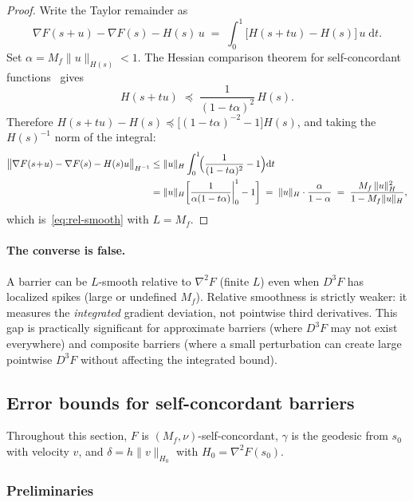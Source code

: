 \documentclass[11pt]{article}
\begin{document}
\begin{proof}
Write the Taylor remainder as
\[
  \nabla F(s+u) - \nabla F(s) - H(s)\,u
  \;=\; \int_0^1 \bigl[H(s+tu) - H(s)\bigr]\,u\;\mathrm{d}t.
\]
Set $\alpha = M_f\|u\|_{H(s)} < 1$.  The Hessian comparison theorem
for self-concordant functions~\cite[Thm.~5.1.1]{nesterov2004} gives
\[
  H(s+tu) \;\preceq\; \frac{1}{(1 - t\alpha)^2}\, H(s).
\]
Therefore $H(s+tu) - H(s) \preceq \bigl[(1-t\alpha)^{-2} - 1\bigr] H(s)$,
and taking the $H(s)^{-1}$ norm of the integral:
\begin{align*}
  \bigl\|\nabla F(s\!+\!u) - \nabla F(s) - H(s)u\bigr\|_{H^{-1}}
  &\leq \|u\|_H \int_0^1 \!\Bigl(\frac{1}{(1-t\alpha)^2} - 1\Bigr)\mathrm{d}t \\
  &= \|u\|_H \biggl[\frac{1}{\alpha(1-t\alpha)}\bigg|_0^1 - 1\biggr]
  \;=\; \|u\|_H \cdot \frac{\alpha}{1-\alpha}
  \;=\; \frac{M_f\,\|u\|_H^2}{1 - M_f\|u\|_H},
\end{align*}
which is~\eqref{eq:rel-smooth} with $L = M_f$.
\end{proof}

\paragraph{The converse is false.}
A barrier can be $L$-smooth relative to $\nabla^2 F$
(finite $L$) even when $D^3 F$ has localized spikes (large or
undefined $M_f$).  Relative smoothness is strictly weaker: it
measures the \emph{integrated} gradient deviation, not pointwise
third derivatives.  This gap is practically significant for
approximate barriers (where $D^3 F$ may not exist everywhere) and
composite barriers (where a small perturbation can create large
pointwise $D^3 F$ without affecting the integrated bound).

\subsection{Error bounds for self-concordant barriers}

Throughout this section, $F$ is $(M_f, \nu)$-self-concordant,
$\gamma$ is the geodesic from $s_0$ with velocity $v$,
and $\delta = h\|v\|_{H_0}$ with $H_0 = \nabla^2 F(s_0)$.

\subsubsection{Preliminaries}
\end{document}
